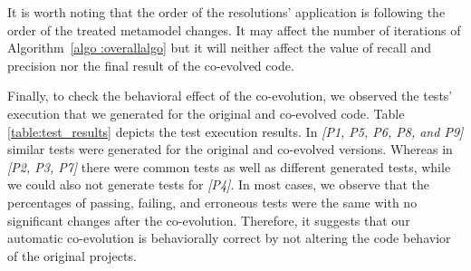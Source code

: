 It is worth noting that the order of the resolutions’ application is following the order of the treated metamodel changes. It may affect the number of iterations of Algorithm~\ref{algo :overallalgo} but it will neither affect the value of recall and precision nor the final result of the co-evolved code.

Finally, to check the behavioral effect of the co-evolution, we observed the tests' execution that we generated for the original and co-evolved code. %
Table \ref{table:test_results} depicts the test execution results. In \emph{[P1, P5, P6, P8, and P9]} similar tests were generated for the original and co-evolved versions. Whereas in \emph{[P2, P3, P7]} there were common tests as well as different generated tests, while we could also not generate tests for \emph{[P4]}. In most cases, we observe that the percentages of passing, failing, and erroneous tests were the same with no significant changes after the co-evolution. 
Therefore, it suggests that our automatic co-evolution is behaviorally correct by not altering the code behavior of the original projects. 


